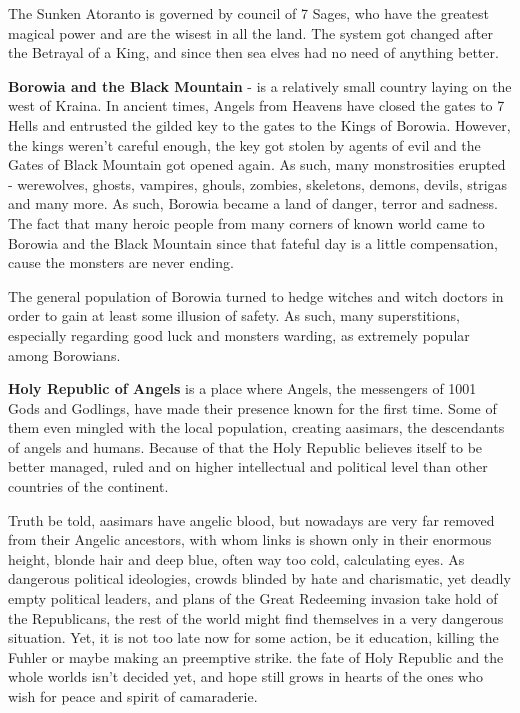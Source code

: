 \documentclass[a4paper,11pt]{article}
\begin{document}
The Sunken Atoranto is governed by council of 7 Sages, who have the greatest magical power and are the wisest in all the land. The system got changed after the Betrayal of a King, and since then sea elves had no need of anything better. 

\textbf{Borowia and the Black Mountain} - is a relatively small country laying on the west of Kraina. In ancient times, Angels from Heavens have closed the gates to 7 Hells and entrusted the gilded key to the gates to the Kings of Borowia. However, the kings weren't careful enough, the key got stolen by agents of evil and the Gates of Black Mountain got opened again. As such, many monstrosities erupted - werewolves, ghosts, vampires, ghouls, zombies, skeletons, demons, devils, strigas and many more. As such, Borowia became a land of danger, terror and sadness. The fact that many heroic people from many corners of known world came to Borowia and the Black Mountain since that fateful day is a little compensation, cause the monsters are never ending. 

The general population of Borowia turned to hedge witches and witch doctors in order to gain at least some illusion of safety. As such, many superstitions, especially regarding good luck and monsters warding, as extremely popular among Borowians. 

\textbf{Holy Republic of Angels} is a place where Angels, the messengers of 1001 Gods and Godlings, have made their presence known for the first time. Some of them even mingled with the local population, creating aasimars, the descendants of angels and humans. Because of that the Holy Republic believes itself to be better managed, ruled and on higher intellectual and political level than other countries of the continent. 

Truth be told, aasimars have angelic blood, but nowadays are very far removed from their Angelic ancestors, with whom links is shown only in their enormous height, blonde hair and deep blue, often way too cold, calculating eyes. As dangerous political ideologies, crowds blinded by hate and charismatic, yet deadly empty political leaders, and plans of the Great Redeeming invasion take hold of the Republicans, the rest of the world might find themselves in a very dangerous situation. Yet, it is not too late now for some action, be it education, killing the Fuhler or maybe making an preemptive strike. the fate of Holy Republic and the whole worlds isn't decided yet, and hope still grows in hearts of the ones who wish for peace and spirit of camaraderie. 
\end{document}
